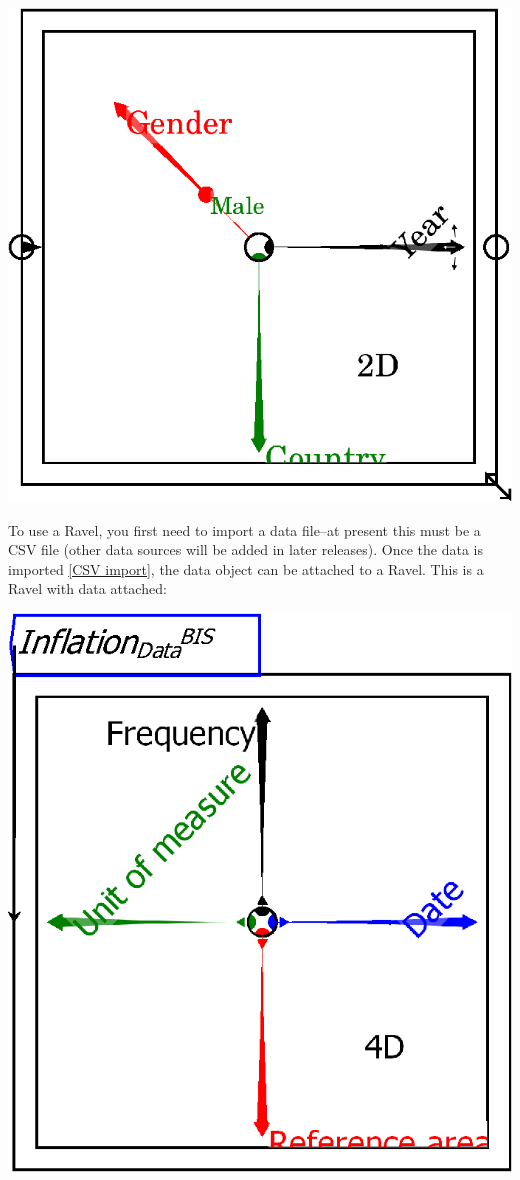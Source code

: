 \begin{center}
  \includegraphics{images/RavelBlank}
\end{center}

To use a Ravel, you first need to import a data file--at present
this must be a CSV file (other data sources will be added in later
releases). Once the data is imported \ref{CSV import}, the data object
can be attached to a Ravel. This is a Ravel with data attached:

\begin{center}
\includegraphics{images/01RavelDataInflation} 
\end{center}

